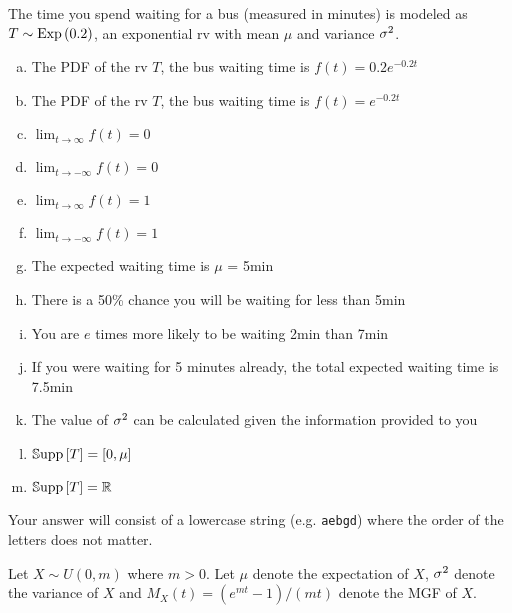 \documentclass[12pt,landscape]{article}
\newcommand{\instr}{\small Your answer will consist of a lowercase string (e.g. \texttt{aebgd}) where the order of the letters does not matter. \normalsize}
\begin{document}
\problem{} The time you spend waiting for a bus (measured in minutes) is modeled as $T \sim \mathrm{Exp}\left(0.2\right)$, an exponential rv with mean $\mu$ and variance $\sigma^2$.

\vspace{-0.2cm}\benum{} 
\begin{enumerate}[(a)]
\item The PDF of the rv $T$, the bus waiting time is $f(t) = 0.2 e^{-0.2 t}$
\item The PDF of the rv $T$, the bus waiting time is $f(t) = e^{-0.2 t}$
\item $\lim_{t \rightarrow \infty} f(t) = 0$
\item $\lim_{t \rightarrow -\infty} f(t) = 0$
\item $\lim_{t \rightarrow \infty} f(t) = 1$
\item $\lim_{t \rightarrow -\infty} f(t) = 1$
\item The expected waiting time is $\mu$ = 5min
\item There is a 50\% chance you will be waiting for less than 5min
\item You are $e$ times more likely to be waiting 2min than 7min
\item If you were waiting for 5 minutes already, the total expected waiting time is 7.5min
\item The value of $\sigma^2$ can be calculated given the information provided to you
\item $\mathbb{S}\text{upp}\left[T\right] = \left[0, \mu\right]$
\item $\mathbb{S}\text{upp}\left[T\right] = \mathbb{R}$
\end{enumerate}
\eenum\instr\pagebreak

\problem{} Let $X \sim U(0, m)$ where $m > 0$. Let $\mu$ denote the expectation of $X$, $\sigma^2$ denote the variance of $X$ and $M_X(t) = (e^{mt} - 1) / (mt)$ denote the MGF of $X$.
\end{document}
